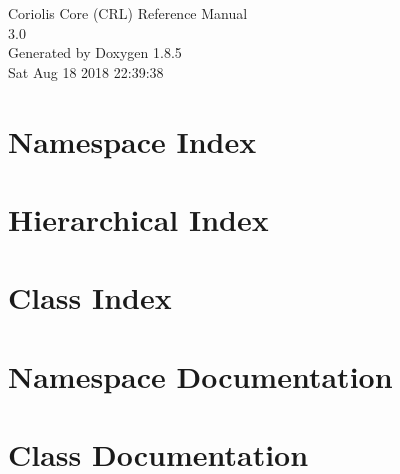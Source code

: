 \documentclass[a4paper]{socbook}
\begin{document}
   \begin{titlepage}
     \vspace*{7cm}
     \begin{center}
     {\Large Coriolis Core (CRL) Reference Manual\\[1ex]\large 3.0 }\\
     \vspace*{1cm}
     {\large Generated by Doxygen 1.8.5}\\
     \vspace*{0.5cm}
     {\small Sat Aug 18 2018 22:39:38}\\
     \end{center}
   \end{titlepage}

   \clearemptydoublepage

   \tableofcontents
   \clearemptydoublepage

\chapter{Namespace Index}

\chapter{Hierarchical Index}

\chapter{Class Index}

\chapter{Namespace Documentation}


\chapter{Class Documentation}















\newpage
{}
{}
\printindex
\end{document}
